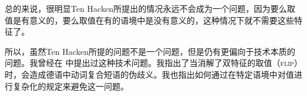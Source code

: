 总的来说，很明显Ten Hacken所提出的情况永远不会成为一个问题，因为要么取值是有意义的，要么取值在有的语境中是没有意义的，这种情况下就不需要这些特征了。

所以，虽然Ten Hacken所提的问题不是一个问题，但是仍有更偏向于技术本质的问题。我曾经在 中提出过这种技术问题。我指出了当消解了双特征的取值（\textsc{flip}）时，会造成德语中动词复合短语的伪歧义。我也指出如何通过在特定语境中对值进行复杂化的规定来避免这一问题。


